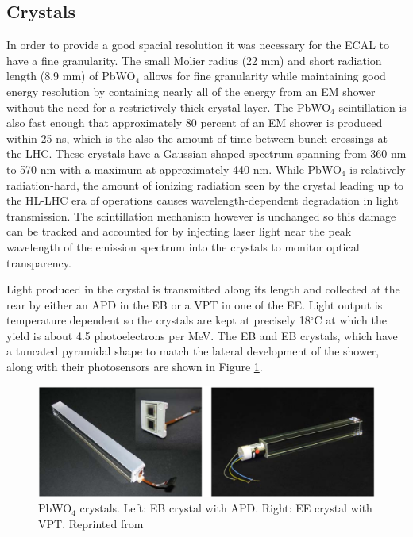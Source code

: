 \subsection{Crystals}
In order to provide a good spacial resolution it was necessary for the ECAL to have a fine granularity. The small Molier radius (22 mm) and short radiation length (8.9 mm) of PbWO$_{4}$ allows for fine granularity while maintaining good energy resolution by containing nearly all of the energy from an EM shower without the need for a restrictively thick crystal layer.  The PbWO$_{4}$ scintillation is also fast enough that approximately 80 percent of an EM shower is produced within 25 ns, which is the also the amount of time between bunch crossings at the LHC.  These crystals have a Gaussian-shaped spectrum spanning from 360 nm to 570 nm with a maximum at approximately 440 nm.  While PbWO$_{4}$ is relatively radiation-hard, the amount of ionizing radiation seen by the crystal leading up to the HL-LHC era of operations causes wavelength-dependent degradation in light transmission.  The scintillation mechanism however is unchanged so this damage can be tracked and accounted for by injecting laser light near the peak wavelength of the emission spectrum into the crystals to monitor optical transparency.

Light produced in the crystal is transmitted along its length and collected at the rear by either an APD in the EB or a VPT in one of the EE.  Light output is temperature dependent so the crystals are kept at precisely 18$^{\circ}$C at which the yield is about 4.5 photoelectrons per MeV.  The EB and EB crystals, which have a tuncated pyramidal shape to match the lateral development of the shower, along with their photosensors are shown in Figure \ref{fig:ecalcrystals}.  

\begin{figure}[h]
	\centering
	\includegraphics[width=0.7\linewidth]{Figures/ECAL_crystals}
	\caption{PbWO$_{4}$ crystals. Left: EB crystal with APD. Right: EE crystal with VPT.  Reprinted from \cite{Collaboration_2008}}
	\label{fig:ecalcrystals}
\end{figure}


